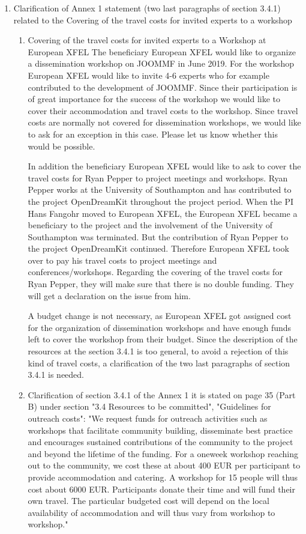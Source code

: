 \begin{enumerate}
\item Clarification of Annex 1 statement (two last paragraphs of section 3.4.1) related to the Covering of the travel costs for invited experts to a workshop

\begin{enumerate}
\item Covering of the travel costs for invited experts to a Workshop at European XFEL 
The beneficiary European XFEL would like to organize a dissemination workshop on JOOMMF in June 2019. For the workshop European XFEL would like to invite 4-6 experts who for example contributed to the development of JOOMMF. Since their participation is of great importance for the success of the workshop we would like to cover their accommodation and travel costs to the workshop. Since travel costs are normally not covered for dissemination workshops, we would like to ask for an exception in this case. Please let us know whether this would be possible.

In addition the beneficiary European XFEL would like to ask to cover the travel costs for Ryan Pepper to project meetings and workshops. Ryan Pepper works at the University of Southampton and has contributed to the project OpenDreamKit throughout the project period. When the PI Hans Fangohr moved to European XFEL, the European XFEL became a beneficiary to the project and the involvement of the University of Southampton was terminated. But the contribution of Ryan Pepper to the project OpenDreamKit continued. Therefore European XFEL took over to pay his travel costs to project meetings and conferences/workshops. Regarding the covering of the travel costs for Ryan Pepper, they will make sure that there is no double funding. They will get a declaration on the issue from him. 

A budget change is not necessary, as European XFEL got assigned cost for the organization of dissemination workshops and have enough funds left to cover the workshop from their budget.
Since the description of the resources at the section 3.4.1 is too general, to avoid a rejection of this kind of travel costs, a clarification of the two last paragraphs of section 3.4.1 is needed. 

\item Clarification of section 3.4.1 of the Annex 1
it is stated on page 35 (Part B) under section "3.4 Resources to be committed", "Guidelines for outreach costs": "We request funds for outreach activities such as workshops that facilitate community building, disseminate best practice and encourages sustained contributions of the community to the project and beyond the lifetime of the funding. For a oneweek workshop reaching out to the community, we cost these at about 400 EUR per participant to provide accommodation and catering. A workshop for 15 people will thus cost about 6000 EUR. Participants donate their time and will fund their own travel. The particular budgeted cost will depend on the local availability of accommodation and will thus vary from workshop to workshop."


\end{enumerate}
\end{enumerate}
